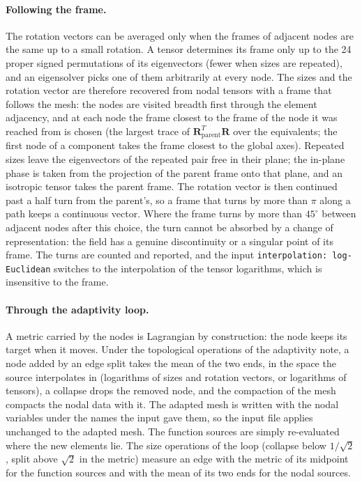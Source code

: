 \documentclass[11pt]{article}
\newcommand{\bs}[1]{\boldsymbol{#1}}
\newcommand{\code}[1]{\texttt{#1}}
\begin{document}
\paragraph{Following the frame.} The rotation vectors can be averaged
only when the frames of adjacent nodes are the same up to a small
rotation. A tensor determines its frame only up to the 24 proper signed
permutations of its eigenvectors (fewer when sizes are repeated), and an
eigensolver picks one of them arbitrarily at every node. The sizes and
the rotation vector are therefore recovered from nodal tensors with a
frame that follows the mesh: the nodes are visited breadth first through
the element adjacency, and at each node the frame closest to the frame of
the node it was reached from is chosen (the largest trace of
$\bs R_{\mathrm{parent}}^T \bs R$ over the equivalents; the first node of
a component takes the frame closest to the global axes). Repeated sizes
leave the eigenvectors of the repeated pair free in their plane; the
in-plane phase is taken from the projection of the parent frame onto that
plane, and an isotropic tensor takes the parent frame. The rotation vector
is then continued past a half turn from the parent's, so a frame that
turns by more than $\pi$ along a path keeps a continuous vector. Where the
frame turns by more than $45^\circ$ between adjacent nodes after this
choice, the turn cannot be absorbed by a change of representation: the
field has a genuine discontinuity or a singular point of its frame. The
turns are counted and reported, and the input
\code{interpolation: log-Euclidean} switches to the interpolation of the
tensor logarithms, which is insensitive to the frame.

\paragraph{Through the adaptivity loop.} A metric carried by the nodes
is Lagrangian by construction: the node keeps its target when it moves.
Under the topological operations of the adaptivity note, a node added by
an edge split takes the mean of the two ends, in the space the source
interpolates in (logarithms of sizes and rotation vectors, or logarithms
of tensors), a collapse drops the removed node, and the compaction of the
mesh compacts the nodal data with it. The adapted mesh is written with the
nodal variables under the names the input gave them, so the input file
applies unchanged to the adapted mesh. The function sources are simply
re-evaluated where the new elements lie. The size operations of the loop
(collapse below $1/\sqrt2$, split above $\sqrt2$ in the metric) measure an
edge with the metric of its midpoint for the function sources and with
the mean of its two ends for the nodal sources.
\end{document}
